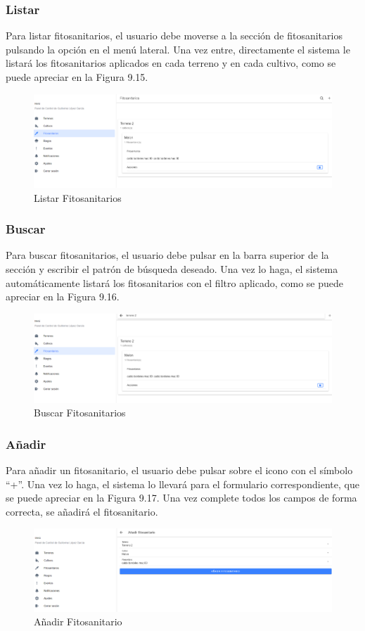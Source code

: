 \subsubsection{Listar}
Para listar fitosanitarios, el usuario debe moverse a la sección de fitosanitarios pulsando la opción en el menú lateral. Una vez entre, directamente el sistema le listará los fitosanitarios aplicados en cada terreno y en cada cultivo, como se puede apreciar en la Figura 9.15.
\begin{figure}[H]
    \centering
    \includegraphics[width=0.7\linewidth]{images/user-manual/phytosanitary/list.png}
    \caption{Listar Fitosanitarios}
\end{figure}

\subsubsection{Buscar}
Para buscar fitosanitarios, el usuario debe pulsar en la barra superior de la sección y escribir el patrón de búsqueda deseado. Una vez lo haga, el sistema automáticamente listará los fitosanitarios con el filtro aplicado, como se puede apreciar en la Figura 9.16.
\begin{figure}[H]
    \centering
    \includegraphics[width=0.7\linewidth]{images/user-manual/phytosanitary/search.png}
    \caption{Buscar Fitosanitarios}
\end{figure}

\subsubsection{Añadir}
Para añadir un fitosanitario, el usuario debe pulsar sobre el icono con el símbolo ``+''. Una vez lo haga, el sistema lo llevará para el formulario correspondiente, que se puede apreciar en la Figura 9.17. Una vez complete todos los campos de forma correcta, se añadirá el fitosanitario.
\begin{figure}[H]
    \centering
    \includegraphics[width=0.7\linewidth]{images/user-manual/phytosanitary/create.png}
    \caption{Añadir Fitosanitario}
\end{figure}


